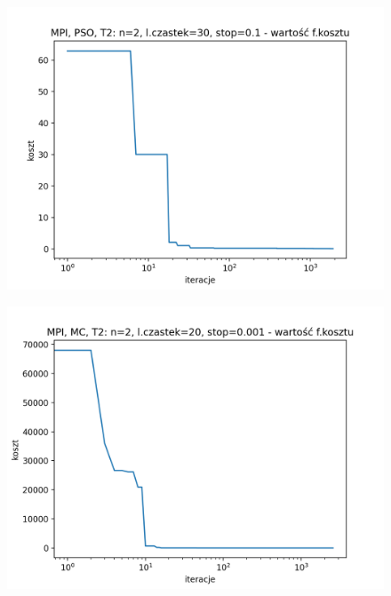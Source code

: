 \documentclass[11pt, a4paper, oneside]{article}
\begin{document}
\begin{figure}[H]
\centering
\begin{minipage}[b]{\dimexpr.5\textwidth-1em}
  \centering
  \includegraphics[width=1\linewidth]{grafiki/MPI_PSO_T2/MPI_PSO_T2_koszt_monotoniczny.png}
  \label{fig:koszt:PSO2}
\end{minipage} \hfill
\begin{minipage}[b]{\dimexpr.5\textwidth-1em}
  \centering
  \includegraphics[width=1\linewidth]{grafiki/MPI_MC_T2/MPI_MC_T2_koszt.png}
  \label{fig:koszt:MC2}
\end{minipage}
\end{figure}
\end{document}
